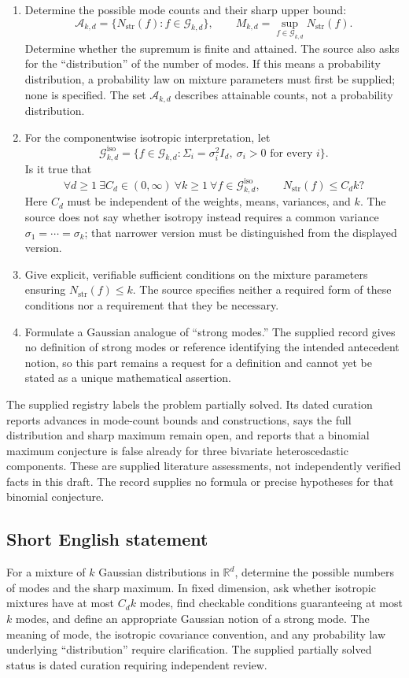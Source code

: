 \documentclass[11pt]{article}
\newcommand{\R}{\mathbb{R}}
\begin{document}
\begin{enumerate}
\item Determine the possible mode counts and their sharp upper bound:
\[
\mathcal A_{k,d}=\{N_{\mathrm{str}}(f):f\in\mathcal G_{k,d}\},
\qquad M_{k,d}=\sup_{f\in\mathcal G_{k,d}}N_{\mathrm{str}}(f).
\]
Determine whether the supremum is finite and attained. The source also asks for the ``distribution'' of the number of modes. If this means a probability distribution, a probability law on mixture parameters must first be supplied; none is specified. The set \(\mathcal A_{k,d}\) describes attainable counts, not a probability distribution.
\item For the componentwise isotropic interpretation, let
\[
\mathcal G^{\mathrm{iso}}_{k,d}=\{f\in\mathcal G_{k,d}:\Sigma_i=\sigma_i^2I_d,\ \sigma_i>0\text{ for every }i\}.
\]
Is it true that
\[
\forall d\geq1\ \exists C_d\in(0,\infty)\ \forall k\geq1\ \forall f\in\mathcal G^{\mathrm{iso}}_{k,d},\qquad N_{\mathrm{str}}(f)\leq C_d k?
\]
Here \(C_d\) must be independent of the weights, means, variances, and \(k\). The source does not say whether isotropy instead requires a common variance \(\sigma_1=\cdots=\sigma_k\); that narrower version must be distinguished from the displayed version.
\item Give explicit, verifiable sufficient conditions on the mixture parameters ensuring \(N_{\mathrm{str}}(f)\leq k\). The source specifies neither a required form of these conditions nor a requirement that they be necessary.
\item Formulate a Gaussian analogue of ``strong modes.'' The supplied record gives no definition of strong modes or reference identifying the intended antecedent notion, so this part remains a request for a definition and cannot yet be stated as a unique mathematical assertion.
\end{enumerate}

The supplied registry labels the problem partially solved. Its dated curation reports advances in mode-count bounds and constructions, says the full distribution and sharp maximum remain open, and reports that a binomial maximum conjecture is false already for three bivariate heteroscedastic components. These are supplied literature assessments, not independently verified facts in this draft. The record supplies no formula or precise hypotheses for that binomial conjecture.
\subsection{Short English statement}
For a mixture of \(k\) Gaussian distributions in \(\R^d\), determine the possible numbers of modes and the sharp maximum. In fixed dimension, ask whether isotropic mixtures have at most \(C_d k\) modes, find checkable conditions guaranteeing at most \(k\) modes, and define an appropriate Gaussian notion of a strong mode. The meaning of mode, the isotropic covariance convention, and any probability law underlying ``distribution'' require clarification. The supplied partially solved status is dated curation requiring independent review.
\end{document}
